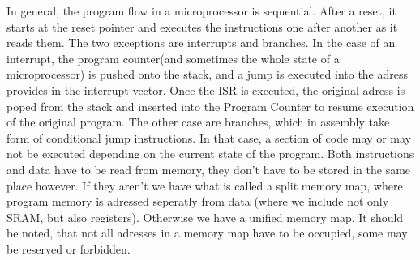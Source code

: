 \sol In general, the program flow in a microprocessor is sequential. After a reset, it starts at the reset pointer
    and executes the instructions one after another as it reads them. The two exceptions are interrupts and
    branches. In the case of an interrupt, the program counter(and sometimes the whole state of a microprocessor) is
    pushed onto the stack, and a jump is executed into the adress provides in the interrupt vector. Once the ISR is 
    executed, the original adress is poped from the stack and inserted into the Program Counter to resume execution
    of the original program. The other case are branches, which in assembly take form of conditional jump instructions.
    In that case, a section of code may or may not be executed depending on the current state of the program. 
    Both instructions and data have to be read from memory, they don't have to be stored in the same place however.
    If they aren't we have what is called a split memory map, where program memory is adressed seperatly from data
    (where we include not only SRAM, but also registers). Otherwise we have a unified memory map. 
    It should be noted, that not all adresses in a memory map have to be occupied, some may be reserved or forbidden.

